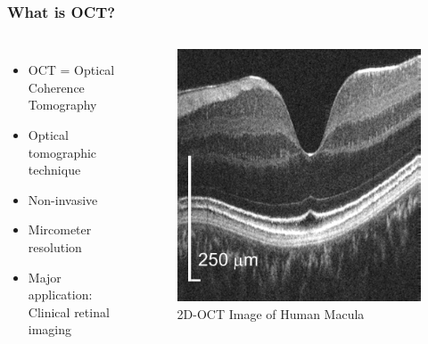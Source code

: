 \begin{frame}
    \frametitle{What is OCT?}
    \begin{columns}[T]

        \begin{itemize}
            \item OCT = Optical Coherence Tomography
            \item Optical tomographic technique
            \item Non-invasive
            \item Mircometer resolution
            \item Major application: Clinical retinal imaging
        \end{itemize}
        \bigskip
        \begin{figure}
            \includegraphics[height=0.7\textheight]{figures/OCTSample.png}
            \caption{2D-OCT Image of Human Macula}
        \end{figure}
    \end{columns}
\end{frame}


